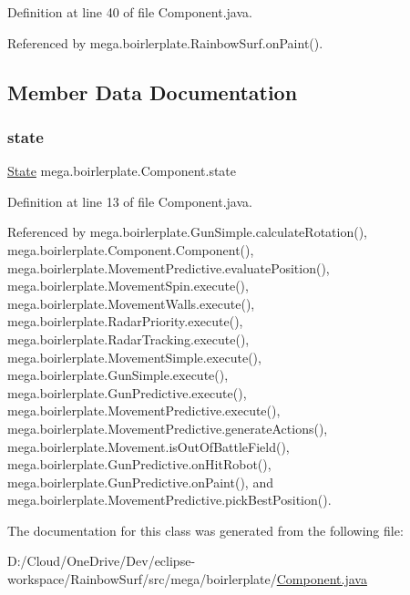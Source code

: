 Definition at line 40 of file Component.\+java.



Referenced by mega.\+boirlerplate.\+Rainbow\+Surf.\+on\+Paint().



\subsection{Member Data Documentation}
\mbox{\label{classmega_1_1boirlerplate_1_1_component_a87b0d70f323b5fee60a200e07c9c20fd}} 
\subsubsection{\texorpdfstring{state}{state}}
{\footnotesize\ttfamily \hyperlink{classmega_1_1boirlerplate_1_1_state}{State} mega.\+boirlerplate.\+Component.\+state\hspace{0.3cm}{\ttfamily [protected]}}



Definition at line 13 of file Component.\+java.



Referenced by mega.\+boirlerplate.\+Gun\+Simple.\+calculate\+Rotation(), mega.\+boirlerplate.\+Component.\+Component(), mega.\+boirlerplate.\+Movement\+Predictive.\+evaluate\+Position(), mega.\+boirlerplate.\+Movement\+Spin.\+execute(), mega.\+boirlerplate.\+Movement\+Walls.\+execute(), mega.\+boirlerplate.\+Radar\+Priority.\+execute(), mega.\+boirlerplate.\+Radar\+Tracking.\+execute(), mega.\+boirlerplate.\+Movement\+Simple.\+execute(), mega.\+boirlerplate.\+Gun\+Simple.\+execute(), mega.\+boirlerplate.\+Gun\+Predictive.\+execute(), mega.\+boirlerplate.\+Movement\+Predictive.\+execute(), mega.\+boirlerplate.\+Movement\+Predictive.\+generate\+Actions(), mega.\+boirlerplate.\+Movement.\+is\+Out\+Of\+Battle\+Field(), mega.\+boirlerplate.\+Gun\+Predictive.\+on\+Hit\+Robot(), mega.\+boirlerplate.\+Gun\+Predictive.\+on\+Paint(), and mega.\+boirlerplate.\+Movement\+Predictive.\+pick\+Best\+Position().



The documentation for this class was generated from the following file\+:\begin{DoxyCompactItemize}
\item 
D\+:/\+Cloud/\+One\+Drive/\+Dev/eclipse-\/workspace/\+Rainbow\+Surf/src/mega/boirlerplate/\hyperlink{_component_8java}{Component.\+java}\end{DoxyCompactItemize}
